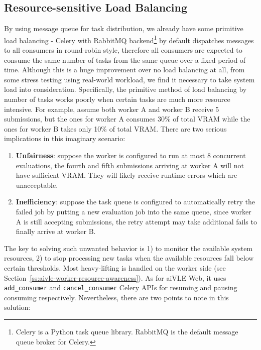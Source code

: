 \subsection{Resource-sensitive Load Balancing}
\label{ss:aivle-web-load-balancing}
By using message queue for task distribution, we already have some primitive load balancing - Celery with RabbitMQ backend\footnote{Celery is a Python task queue library. RabbitMQ is the default message queue broker for Celery.} by default dispatches messages to all consumers in round-robin style, therefore all consumers are expected to consume the same number of tasks from the same queue over a fixed period of time. Although this is a huge improvement over no load balancing at all, from some stress testing using real-world workload, we find it necessary to take system load into consideration. Specifically, the primitive method of load balancing by number of tasks works poorly when certain tasks are much more resource intensive. For example, assume both worker A and worker B receive 5 submissions, but the ones for worker A consumes 30\% of total VRAM while the ones for worker B takes only 10\% of total VRAM. There are two serious implications in this imaginary scenario:
\begin{enumerate}
    \item \textbf{Unfairness}: suppose the worker is configured to run at most 8 concurrent evaluations, the fourth and fifth submissions arriving at worker A will not have sufficient VRAM. They will likely receive runtime errors which are unacceptable.
    \item \textbf{Inefficiency}: suppose the task queue is configured to automatically retry the failed job by putting a new evaluation job into the same queue, since worker A is still accepting submissions, the retry attempt may take additional fails to finally arrive at worker B.
\end{enumerate}

The key to solving such unwanted behavior is 1) to monitor the available system resources, 2) to stop processing new tasks when the available resources fall below certain thresholds. Most heavy-lifting is handled on the worker side (see Section~\ref{ss:aivle-worker-resource-awareness}). As for aiVLE Web, it uses \texttt{add\_consumer} and \texttt{cancel\_consumer} Celery APIs for resuming and pausing consuming respectively. Nevertheless, there are two points to note in this solution:

